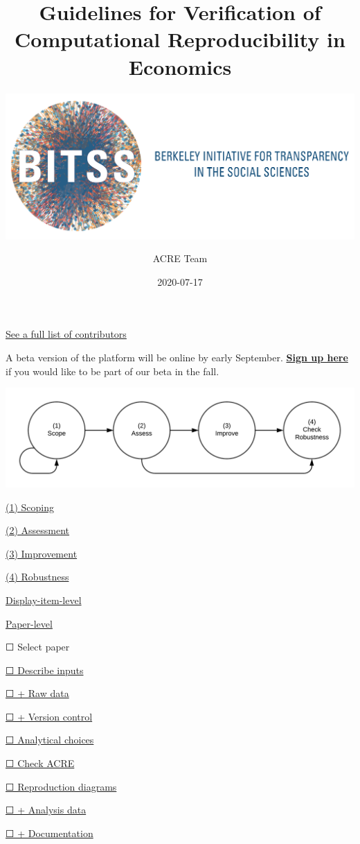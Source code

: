 \documentclass[]{book}
\title{Guidelines for Verification of Computational Reproducibility in Economics}
\subtitle{\href{https://www.bitss.org/}{\includegraphics{BITSS_logo_horizontal.png}}\\}
\author{ACRE Team}
\date{2020-07-17}
\begin{document}
\maketitle

{
\setcounter{tocdepth}{1}
\tableofcontents
}
\hypertarget{section}{%
\chapter*{}\label{section}}

\protect\hyperlink{contributions}{See a full list of contributors}

A beta version of the platform will be online by early September.
\href{https://forms.gle/yZivWcwijCzEhrBU6}{\textbf{Sign up here}} if you would like to be part of our beta in the fall.

\includegraphics[width=1\linewidth]{stages}

\protect\hyperlink{scoping}{(1) Scoping}

\protect\hyperlink{assessment}{(2) Assessment}

\protect\hyperlink{improvements}{(3) Improvement}

\protect\hyperlink{robust}{(4) Robustness}

\protect\hyperlink{di-imp}{Display-item-level}

\protect\hyperlink{paper-level}{Paper-level}

☐ Select paper

\protect\hyperlink{describe-inputs}{☐ Describe inputs}

\protect\hyperlink{rd}{☐ + Raw data}

\protect\hyperlink{paper-level}{☐ + Version control}

\protect\hyperlink{id-analy}{☐ Analytical choices}

\protect\hyperlink{check-acre}{☐ Check ACRE}

\protect\hyperlink{diagram}{☐ Reproduction diagrams}

\protect\hyperlink{ad}{☐ + Analysis data}

\protect\hyperlink{paper-level}{☐ + Documentation}
\end{document}
